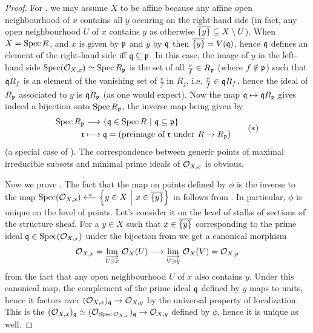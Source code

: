\documentclass[a4paper,parskip=half,numbers=enddot, DIV=12]{scrreprt}
\begin{document}
\begin{proof}
    For , we may assume $X$ to be affine because any affine open neighbourhood of $x$ contains all $y$ occuring on the right-hand side (in fact, any open neighbourhood $U$ of $x$ contains $y$ as otherwise $\overline{\{y\}}\subseteq X\setminus U$). When $X=\operatorname{Spec} R$, and $x$ is given by $\mathfrak{p}$ and $y$ by $\mathfrak{q}$ then $\overline{\{y\}} = V(\mathfrak{q})$, hence $\mathfrak{q}$ defines an element of the right-hand side iff $\mathfrak{q}\subseteq \mathfrak{p}$. In this case, the image of $y$ in the left-hand side $\operatorname{Spec}(\mathcal{O}_{X,x})\simeq \operatorname{Spec} R_{\mathfrak{p}}$ is the set of all $\frac{r}{f}\in R_{\mathfrak{p}}$ (where $f\notin\mathfrak{p}$) such that $\mathfrak{q} R_f$ is an element of the vanishing set of $\frac{r}{f}$ in $R_f$, i.e. $\frac{r}{f}\in \mathfrak{q} R_f$, hence the ideal of $R_{\mathfrak{p}}$ associated to $y$ is $\mathfrak{q} R_{\mathfrak{p}}$ (as one would expect). Now the map $\mathfrak{q}\mapsto\mathfrak{q} R_{\mathfrak{p}}$ gives indeed a bijection onto $\operatorname{Spec} R_{\mathfrak{p}}$, the inverse map being given by 
    \begin{align}\lbl{eq:localizationBijection}
    	\begin{split}
	    	\Spec R_\pp &\morphism \left\{\qq\in\Spec R\st\qq\subseteq\pp\right\}\\ \rr&\longmapsto \qq= (\text{preimage of }\rr\text{ under }R\to R_\pp)
    	\end{split}\tag{$*$}
    \end{align}
    (a special case of \cite[Corollary~2.3.1]{alg1}). The correspondence between generic points of maximal irreducible subsets and minimal prime ideals of $\mathcal{O}_{X,x}$ is obvious.
    
    Now we prove . The fact that the map on points defined by $\phi$ is the inverse to the map $\Spec(\Oo_{X,x}) \lisomorphism \left\{y\in X\st x\in \ov{\{y\}}\right\}$ in  follows from . In particular, $\phi$ is unique on the level of points. Let's consider it on the level of stalks of sections of the structure sheaf. For a $y\in X$ such that $x\in\overline{\{y\}}$ corresponding to the prime ideal $\mathfrak{q}\in\operatorname{Spec}(\mathcal{O}_{X,x})$ under the bijection from  we get a canonical morphism
    \begin{align*}
        \Oo_{X,x} = \colimit[U\ni x] \Oo_X(U) \morphism \colimit[V\ni y] \Oo_X(V)=\Oo_{X,y}
    \end{align*}
    from the fact that any open neighbourhood $U$ of $x$ also contains $y$. Under this canonical map, the complement of the prime ideal $\mathfrak{q}$ defined by $y$ maps to units, hence it factors over $(\Oo_{X,x})_\qq\morphism \Oo_{X,y}$ by the universal property of localization. This is the $(\Oo_{X,x})_\qq \simeq (\Oo_{\Spec \Oo_{X,x}})_\qq \morphism \Oo_{X,y}$ defined by $\phi$, hence it is unique as well.
\end{proof}
\end{document}
